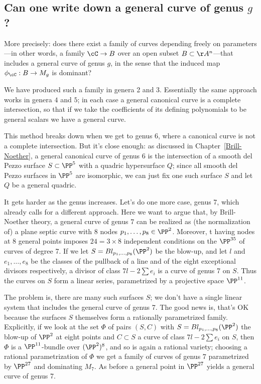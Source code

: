 \subsection{Can one write down a general curve of genus $g$?}\label{mgunirational}

More precisely: does there exist  a family of curves depending freely on parameters---in other words, a family $\cC \to B$ over an open subset $B \subset \AA^n$---that includes a general curve of genus $g$, in the sense that the induced map $\phi_\cC : B \to M_g$ is dominant? 	

We have produced such a family in genera 2 and 3. Essentially
the same approach works in genera $4$ and $5$; in each case a general canonical curve is a complete intersection, so that if we take the coefficients of its defining polynomials to be general scalars we have a general curve.

This method breaks down when we get to genus 6, where a canonical curve is not a complete intersection. But it's close enough: as discussed in Chapter~\ref{Brill-Noether}, a general canonical curve of genus 6 is the intersection of a smooth del Pezzo surface $S \subset \PP^5$ with a quadric hypersurface $Q$; since all smooth del Pezzo surfaces in $\PP^5$ are isomorphic, we can just fix one such surface $S$ and let $Q$ be a general quadric.

It gets harder as the genus increases. Let's do one more case, genus 7, which already calls for a different approach. Here we want to argue that, by Brill-Noether theory, a general curve of genus $7$ can be realized as (the normalization of) a plane septic curve with 8 nodes $p_1,\dots,p_8 \in \PP^2$. Moreover, t having nodes at 8 general points imposes $24= 3\times 8$ independent conditions on the $\PP^{35}$ of curves of degree 7. 
If we let $S = Bl_{p_1,\dots,p_8}(\PP^2)$ be the blow-up, and let $l$ and $e_1,\dots,e_8$ be the classes of the pullback of a line and of the eight exceptional divisors respectively, a divisor of class $7l - 2 \sum e_i$ is a curve of genus 7 on $S$. Thus the curves on $S$ form a linear series, parametrized by a projective space $\PP^{11}$.

The problem is, there are many such surfaces $S$; we don't have a single linear system that includes the general curve of genus 7. The good news is, that's OK because the surfaces $S$ themselves form a rationally parametrized family. Explicitly, if we look at the set $\Phi$ of pairs $(S, C)$ with $S = Bl_{p_1,\dots,p_8}(\PP^2)$  the blow-up of $\PP^2$ at eight points and $C \subset S$ a curve of class $7l - 2 \sum e_i$ on $S$, then $\Phi$ is a $\PP^{11}$-bundle over $(\PP^2)^8$, and so is again a rational variety; choosing a rational parametrization of $\Phi$ we get a family of curves of genus $7$ parametrized by $\PP^{27}$ and dominating $M_7$. As before a general point in $\PP^{27}$ yields a general curve of genus 7.


